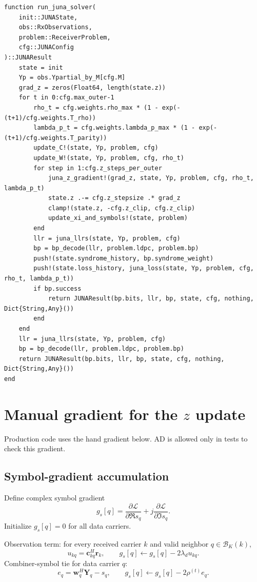 \documentclass[11pt]{article}
\begin{document}
\begin{lstlisting}
function run_juna_solver(
    init::JUNAState,
    obs::RxObservations,
    problem::ReceiverProblem,
    cfg::JUNAConfig
)::JUNAResult
    state = init
    Yp = obs.Ypartial_by_M[cfg.M]
    grad_z = zeros(Float64, length(state.z))
    for t in 0:cfg.max_outer-1
        rho_t = cfg.weights.rho_max * (1 - exp(-(t+1)/cfg.weights.T_rho))
        lambda_p_t = cfg.weights.lambda_p_max * (1 - exp(-(t+1)/cfg.weights.T_parity))
        update_C!(state, Yp, problem, cfg)
        update_W!(state, Yp, problem, cfg, rho_t)
        for step in 1:cfg.z_steps_per_outer
            juna_z_gradient!(grad_z, state, Yp, problem, cfg, rho_t, lambda_p_t)
            state.z .-= cfg.z_stepsize .* grad_z
            clamp!(state.z, -cfg.z_clip, cfg.z_clip)
            update_xi_and_symbols!(state, problem)
        end
        llr = juna_llrs(state, Yp, problem, cfg)
        bp = bp_decode(llr, problem.ldpc, problem.bp)
        push!(state.syndrome_history, bp.syndrome_weight)
        push!(state.loss_history, juna_loss(state, Yp, problem, cfg, rho_t, lambda_p_t))
        if bp.success
            return JUNAResult(bp.bits, llr, bp, state, cfg, nothing, Dict{String,Any}())
        end
    end
    llr = juna_llrs(state, Yp, problem, cfg)
    bp = bp_decode(llr, problem.ldpc, problem.bp)
    return JUNAResult(bp.bits, llr, bp, state, cfg, nothing, Dict{String,Any}())
end
\end{lstlisting}

\section{Manual gradient for the $z$ update}

Production code uses the hand gradient below. AD is allowed only in tests to check this gradient.

\subsection{Symbol-gradient accumulation}

Define complex symbol gradient
\begin{equation}
g_s[q]=\frac{\partial\mathcal L}{\partial \Re s_q}+j\frac{\partial\mathcal L}{\partial \Im s_q}.
\end{equation}
Initialize $g_s[q]=0$ for all data carriers.

Observation term: for every received carrier $k$ and valid neighbor $q\in\mathcal B_K(k)$,
\begin{equation}
u_{kq}=\mathbf c_{kq}^H\mathbf r_k,
\qquad
 g_s[q]\leftarrow g_s[q]-2\lambda_d u_{kq}.
\end{equation}
Combiner-symbol tie for data carrier $q$:
\begin{equation}
e_q=\mathbf w_q^H\mathbf Y_q-s_q,
\qquad
 g_s[q]\leftarrow g_s[q]-2\rho^{(t)}e_q.
\end{equation}
\end{document}
